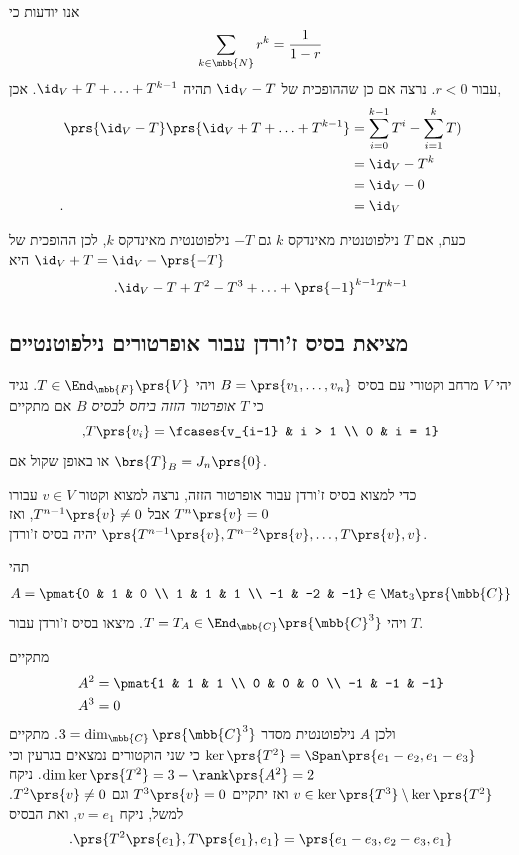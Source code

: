 \documentclass[a4paper,10pt,twoside,openany]{book}
\begin{document}
\begin{solution}
אנו יודעות כי
\[\sum_{k \in \mbb{N}} r^k = \frac{1}{1-r}\]
עבור
$r < 0$.
נרצה אם כן שההופכית של
$\id_V - T$
תהיה
$\id_V + T + \ldots + T^{k-1}$.
אכן,
\begin{align*}
\prs{\id_V - T}\prs{\id_V + T + \ldots + T^{k-1}} &= \sum_{i = 0}^{k-1} T^{i} - \sum_{i = 1}^k T^^i
\\&= \id_V - T^k
\\&= \id_V - 0
\\ \text{.} \hphantom{\prs{\id_V - T}\prs{\id_V + T + \ldots + T^{k-1}}} &= \id_V
\end{align*}

כעת, אם
$T$
נילפוטנטית מאינדקס
$k$
גם
$-T$
נילפוטנטית מאינדקס
$k$,
לכן ההופכית של
$\id_V + T = \id_V - \prs{-T}$
היא
\[\text{.} \id_V - T + T^2 - T^3 + \ldots + \prs{-1}^{k-1} T^{k-1}\]
\end{solution}

\subsection{מציאת בסיס ז'ורדן עבור אופרטורים נילפוטנטיים}

\begin{definition}
יהי
$V$
מרחב וקטורי עם בסיס
$B = \prs{v_1, \ldots, v_n}$
ויהי
$T \in \End_{\mbb{F}}\prs{V}$.
נגיד כי
$T$
\emph{אופרטור הזזה ביחס לבסיס
$B$}
אם מתקיים
\[\text{,} T\prs{v_i} = \fcases{v_{i-1} & i > 1 \\ 0 & i = 1}\]
או באופן שקול אם
$\brs{T}_B = J_n\prs{0}$.
\end{definition}

כדי למצוא בסיס ז'ורדן עבור אופרטור הזזה, נרצה למצוא וקטור
$v \in V$
עבורו
$T^n\prs{v} = 0$
אבל
$T^{n-1}\prs{v} \neq 0$,
ואז
$\prs{T^{n-1}\prs{v}, T^{n-2}\prs{v}, \ldots, T\prs{v}, v}$
יהיה בסיס ז'ורדן.

\begin{exercisechap}
תהי
\begin{align*}
A = \pmat{0 & 1 & 0 \\ 1 & 1 & 1 \\ -1 & -2 & -1} \in \Mat_3\prs{\mbb{C}}
\end{align*}
ויהי
$T = T_A \in \End_{\mbb{C}}\prs{\mbb{C}^3}$.
מיצאו בסיס ז'ורדן עבור
$T$.
\end{exercisechap}

\begin{solution}
מתקיים
\begin{align*}
A^2 &= \pmat{1 & 1 & 1 \\ 0 & 0 & 0 \\ -1 & -1 & -1} \\
A^3 &= 0
\end{align*}
ולכן
$A$
נילפוטנטית מסדר
$3 = \dim_{\mbb{C}}\prs{\mbb{C}^3}$.
מתקיים
$\ker\prs{T^2} = \Span\prs{e_1 - e_2, e_1 - e_3}$
כי שני הוקטורים נמצאים בגרעין וכי
$\dim\ker\prs{T^2} = 3 - \rank\prs{A^2} = 2$.
ניקח
$v \in \ker\prs{T^3} \setminus \ker\prs{T^2}$
ואז יתקיים
$T^3\prs{v} = 0$
וגם
$T^2\prs{v} \neq 0$.
למשל, ניקח
$v = e_1$,
ואת הבסיס
\[\text{.} \prs{T^2\prs{e_1}, T\prs{e_1}, e_1} = \prs{e_1 - e_3, e_2 - e_3, e_1}\]
\end{solution}
\end{document}
